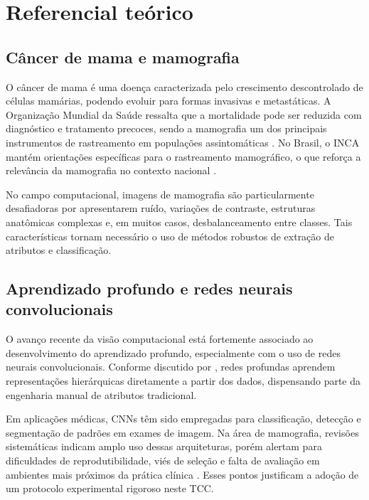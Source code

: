 \documentclass[
    12pt,
    openright,
    oneside,
    a4paper,
    english,
    brazil
]{abntex2}
\begin{document}
\section{Referencial teórico}
\label{sec:referencial}

\subsection{Câncer de mama e mamografia}

O câncer de mama é uma doença caracterizada pelo crescimento descontrolado de células mamárias, podendo evoluir para formas invasivas e metastáticas. A Organização Mundial da Saúde ressalta que a mortalidade pode ser reduzida com diagnóstico e tratamento precoces, sendo a mamografia um dos principais instrumentos de rastreamento em populações assintomáticas \cite{WHO2025BreastCancer}. No Brasil, o INCA mantém orientações específicas para o rastreamento mamográfico, o que reforça a relevância da mamografia no contexto nacional \cite{INCA2025Rastreamento}.

No campo computacional, imagens de mamografia são particularmente desafiadoras por apresentarem ruído, variações de contraste, estruturas anatômicas complexas e, em muitos casos, desbalanceamento entre classes. Tais características tornam necessário o uso de métodos robustos de extração de atributos e classificação.

\subsection{Aprendizado profundo e redes neurais convolucionais}

O avanço recente da visão computacional está fortemente associado ao desenvolvimento do aprendizado profundo, especialmente com o uso de redes neurais convolucionais. Conforme discutido por , redes profundas aprendem representações hierárquicas diretamente a partir dos dados, dispensando parte da engenharia manual de atributos tradicional.

Em aplicações médicas, CNNs têm sido empregadas para classificação, detecção e segmentação de padrões em exames de imagem. Na área de mamografia, revisões sistemáticas indicam amplo uso dessas arquiteturas, porém alertam para dificuldades de reprodutibilidade, viés de seleção e falta de avaliação em ambientes mais próximos da prática clínica \cite{Bhalla2023MammographyReview}. Esses pontos justificam a adoção de um protocolo experimental rigoroso neste TCC.
\end{document}

